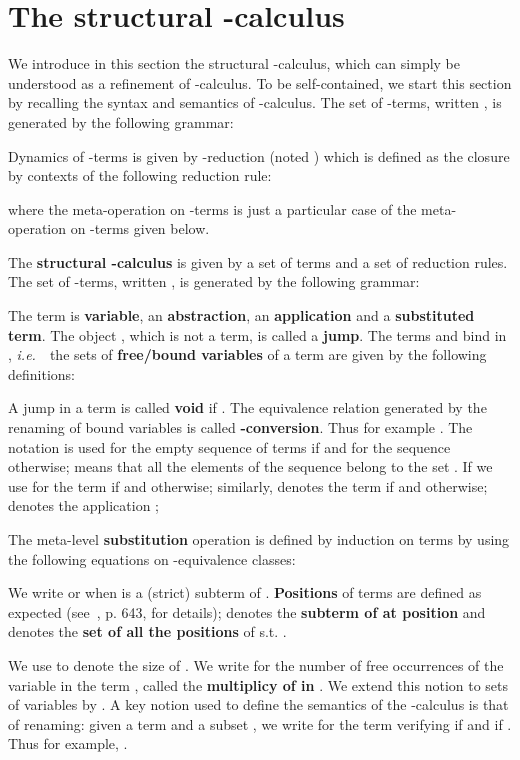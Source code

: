 \documentclass{LMCS}
\newcommand{\ie}{{\it  i.e.}~}
\renewcommand{\>}{\rightarrow}
\newcommand{\deft}[1]{{\bf #1}}
\begin{document}
\section{The structural -calculus}
\label{s:structural-lj}


We introduce in this section the structural -calculus,
which can simply be understood as a refinement of  -calculus.  To be self-contained, 
we start this section by recalling the syntax and semantics of -calculus. 
The set of -terms,  written  ,
is generated by the following grammar:

Dynamics of -terms is   given by -reduction (noted ) 
which is  defined as the closure by contexts of
the following reduction rule:
  
where the meta-operation  on -terms is just a particular case
of the meta-operation on -terms given below.



The \deft{structural -calculus} is given by a set of
terms and a set of reduction rules. The set of -terms,  written  ,
is generated by the following grammar:


The term  is \deft{variable},  an \deft{abstraction}, 
an \deft{application} and  a \deft{substituted term}. The object
, which is not a term, is called a \deft{jump}.  The terms  and  bind  in , \ie\ the sets of \deft{free/bound
  variables} of a term are given by the following definitions:
 
A jump  in a
term  is called \deft{void} if .  The
equivalence relation generated by the renaming of bound variables is
called \deft{-conversion}.  Thus for example .  
The notation  is used for the empty sequence of terms if  and
for the sequence  otherwise;  
means that all the elements of the sequence belong to the set .
If  we use  for the term  if  and 
 otherwise; similarly,  
denotes the term  if  and 
 otherwise; 
 denotes the application 
; 

The meta-level \deft{substitution} operation is defined by
induction on terms by using the following equations on -equivalence classes:
 

We write  or  when  is a (strict) subterm of .
\deft{Positions} of terms are defined as expected (see~\cite{Terese03}, p. 643, for details);   denotes
the \deft{subterm of  at position }
and  denotes the \deft{set of all the positions}  of
 s.t. . 


We use  to denote the size of . We write  for the
number of free occurrences of the variable  in the term ,
called the \deft{multiplicy of  in }. We extend this notion to sets of variables by
  . 
A key notion used to define the semantics 
of the -calculus is that of renaming:
given a term  and a subset
, we write  for
the term  verifying  if 
and  if . Thus for example,
. 
\end{document}
